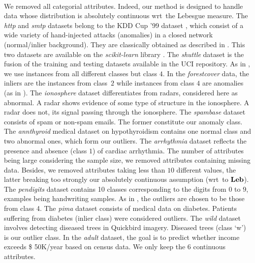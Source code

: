 \paragraph{}
We removed all categorial attributes. Indeed, our method is designed to handle
data whose distribution is absolutely continuous \acs{wrt}~the Lebesgue
measure. 
%
The \emph{http} and \emph{smtp} datasets belong to the \acs{KDD} Cup '99
dataset \citep{KDD99, Tavallaee2009}, which consist of a wide variety of
hand-injected attacks (anomalies) in a closed network (normal/inlier
background). They are classically obtained as described in
\citet{Yamanishi2000}. This two datasets are available on the
\emph{scikit-learn} library \citep{pedregosa2011scikit}. The \emph{shuttle}
dataset is the fusion of the training and testing datasets available in the
\acs{UCI} repository. As in \citet{Liu2008}, we use instances from all
different classes but class $4$. 
In the \emph{forestcover} data, the inliers are the instances from class~$2$
while instances from class $4$ are anomalies (as in \citet{Liu2008}). 
The \emph{ionosphere} dataset differentiates  from  radars,
considered here as abnormal. A  radar shows evidence of some type of
structure in the ionosphere. A  radar does not, its signal passing
through the ionosphere.
The \emph{spambase} dataset consists of spam or non-spam emails. The former
constitute our anomaly class.  The \emph{annthyroid} medical dataset on
hypothyroidism contains one normal class and two abnormal ones, which form our
outliers.
The \emph{arrhythmia} dataset reflects the presence and absence (class $1$) of
cardiac arrhythmia. The number of attributes being large considering the sample
size, we removed attributes containing missing data.  Besides, we removed
attributes taking less than $10$ different values, the latter breaking too
strongly our absolutely continuous assumption (\acs{wrt}~to $\mathbf{Leb}$).
The \emph{pendigits} dataset contains 10 classes corresponding to the digits
from 0 to 9, examples being handwriting samples. As in \citet{Schubert2012},
the outliers are chosen to be those from class 4.  The \emph{pima} dataset
consists of medical data on diabetes. Patients suffering from diabetes (inlier
class) were considered outliers.  The \emph{wild} dataset involves detecting
diseased trees in Quickbird imagery. Diseased trees (class `w') is our outlier
class.  In the \emph{adult} dataset, the goal is to predict whether income
exceeds \$ 50K/year based on census data. We only keep the 6 continuous
attributes.

